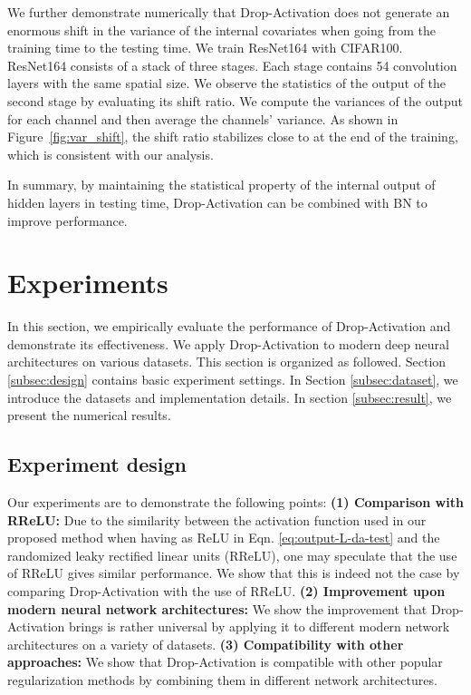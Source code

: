 \documentclass[11pt]{article}
\begin{document}
We further demonstrate numerically that Drop-Activation does not generate an enormous shift in the variance of the internal covariates when going from the training time to the testing time. We train ResNet164 with CIFAR100. ResNet164 consists of a stack of three stages. Each stage contains 54 convolution layers with the same spatial size.  We observe the statistics of the output of the second stage by evaluating its shift ratio. We compute the variances of the output for each channel and then average the channels' variance. As shown in Figure~\ref{fig:var_shift}, the shift ratio stabilizes close to  at the end of the training, which is consistent with our analysis.

In summary, by maintaining the statistical property of the internal output of hidden layers in testing time, Drop-Activation can be combined with BN to improve performance.


\section{Experiments}
\label{sec:4}
In this section, we empirically evaluate the performance of Drop-Activation and demonstrate its effectiveness. We apply Drop-Activation to modern deep neural architectures on various datasets. This section is organized as followed. Section \ref{subsec:design} contains basic experiment settings. In Section \ref{subsec:dataset}, we introduce the datasets and implementation details. In section \ref{subsec:result}, we present the numerical results.

\subsection{Experiment design}
\label{sec:exp design}
Our experiments are to demonstrate the following points:
\textbf{(1) Comparison with RReLU:} Due to the similarity between the activation function used in our proposed method when having  as ReLU in Eqn. \eqref{eq:output-L-da-test} and the randomized leaky rectified linear units (RReLU), one may speculate that the use of RReLU gives similar performance. We show that this is indeed not the case by comparing Drop-Activation with the use of RReLU.
\textbf{(2) Improvement upon modern neural network architectures:} We show the improvement that Drop-Activation brings is rather universal by applying it to different modern network architectures on a variety of datasets.
\textbf{(3) Compatibility with other approaches:} We show that Drop-Activation is compatible with other popular regularization methods by combining them in different network architectures.
\end{document}
